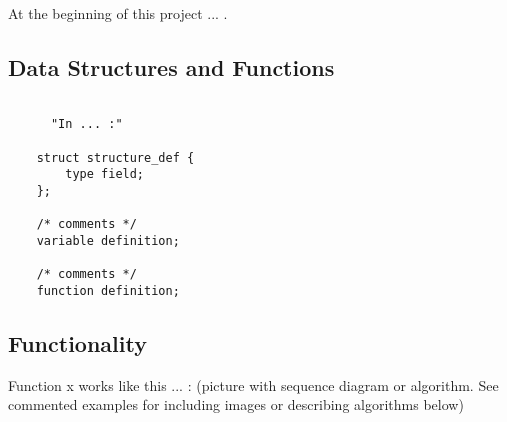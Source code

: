 	At the beginning of this project ... .

    \subsection{Data Structures and Functions}

    \begin{lstlisting}

      "In ... :"
	
	struct structure_def {
	    type field;
	};

	/* comments */
	variable definition;

	/* comments */
	function definition;

    \end{lstlisting}


    \subsection{Functionality}

	Function x works like this ... : (picture with sequence diagram or algorithm. See commented examples for including images or describing algorithms below)






